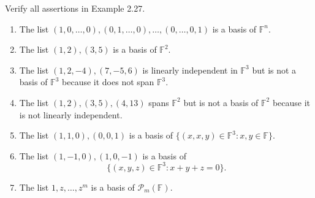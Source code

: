 \begin{exercise}
    Verify all assertions in Example 2.27.
    \begin{enumerate}[label={(\alph*)}]
        \item The list $(1, 0, \ldots, 0), (0, 1, \ldots, 0), \ldots, (0, \ldots, 0, 1)$ is a basis of $\mathbb{F}^{n}$.
        \item The list $(1, 2), (3, 5)$ is a basis of $\mathbb{F}^{2}$.
        \item The list $(1, 2, -4), (7, -5, 6)$ is linearly independent in $\mathbb{F}^{3}$ but is not a basis of $\mathbb{F}^{3}$ because it does not span $\mathbb{F}^{3}$.
        \item The list $(1, 2), (3, 5), (4, 13)$ spans $\mathbb{F}^{2}$ but is not a basis of $\mathbb{F}^{2}$ because it is not linearly independent.
        \item The list $(1, 1, 0), (0, 0, 1)$ is a basis of $\{ (x, x, y)\in\mathbb{F}^{3}: x, y\in\mathbb{F} \}$.
        \item The list $(1, -1, 0), (1, 0, -1)$ is a basis of
              \[
                  \{ (x, y, z)\in\mathbb{F}^{3}: x + y + z = 0 \}.
              \]
        \item The list $1, z, \ldots, z^{m}$ is a basis of $\mathcal{P}_{m}(\mathbb{F})$.
    \end{enumerate}
\end{exercise}

